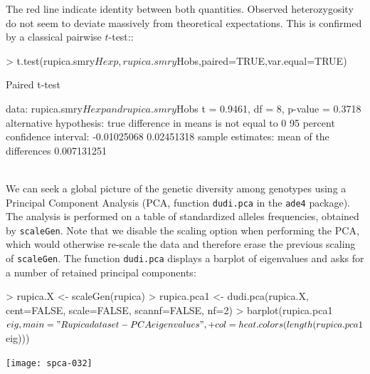 \documentclass{article}
\begin{document}
\noindent The red line indicate identity between both quantities.
Observed heterozygosity do not seem to deviate massively from theoretical expectations.
This is confirmed by a classical pairwise $t$-test::
\begin{Schunk}
\begin{Sinput}
> t.test(rupica.smry$Hexp, rupica.smry$Hobs,paired=TRUE,var.equal=TRUE)
\end{Sinput}
\begin{Soutput}
	Paired t-test

data:  rupica.smry$Hexp and rupica.smry$Hobs
t = 0.9461, df = 8, p-value = 0.3718
alternative hypothesis: true difference in means is not equal to 0
95 percent confidence interval:
 -0.01025068  0.02451318
sample estimates:
mean of the differences 
            0.007131251 
\end{Soutput}
\end{Schunk}
~\\

We can seek a global picture of the genetic diversity among genotypes
using a Principal Component Analysis (PCA, function \texttt{dudi.pca} in the \texttt{ade4}
package).
The analysis is performed on a table of standardized alleles
frequencies, obtained by \texttt{scaleGen}.
Note that we disable the scaling option when performing the PCA, which would otherwise re-scale the
data and therefore erase the previous scaling of \texttt{scaleGen}.
The function \texttt{dudi.pca} displays a barplot of
eigenvalues and asks for a number of retained principal components:
\begin{Schunk}
\begin{Sinput}
> rupica.X <- scaleGen(rupica)
> rupica.pca1 <- dudi.pca(rupica.X, cent=FALSE, scale=FALSE, scannf=FALSE, nf=2)
> barplot(rupica.pca1$eig, main="Rupica dataset - PCA eigenvalues",
+         col=heat.colors(length(rupica.pca1$eig)))
\end{Sinput}
\end{Schunk}
\texttt{[image: spca-032]}
\end{document}
